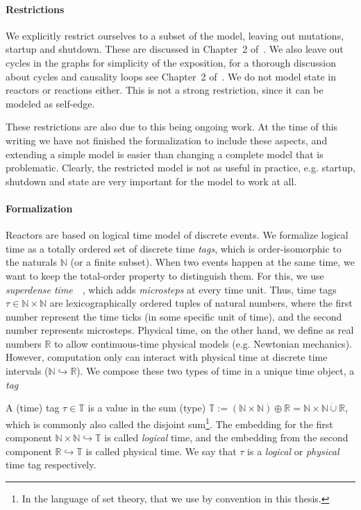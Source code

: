 \paragraph{Restrictions}
We explicitly restrict ourselves to a subset of the model, leaving out mutations, startup and shutdown.
These are discussed in Chapter~2 of~\cite{lohstroh_phdthesis}.
We also leave out cycles in the graphs for simplicity of the exposition, for a thorough discussion about cycles and causality loops see Chapter~2 of~\cite{lohstroh_phdthesis}.
We do not model state in reactors or reactions either.
This is not a strong restriction, since it can be modeled as self-edge.

These restrictions are also due to this being ongoing work.
At the time of this writing we have not finished the formalization to include these aspects, and extending a simple model is easier than changing a complete model that is problematic.
Clearly, the restricted model is not as useful in practice, e.g. startup, shutdown and state are very important for the model to work at all.

\paragraph{Formalization}
Reactors are based on logical time model of discrete events.
We formalize logical time as a totally ordered set of discrete time \emph{tags}, which is order-isomorphic to the naturals $\mathbb{N}$ (or a finite subset). 
When two events happen at the same time, we want to keep the total-order property to distinguish them.
For this, we use \emph{superdense time}~\cite{superdense,Ptolemaeus:14:SystemDesign}~, which adds \emph{microsteps} at every time unit.
Thus, time tags $\tau \in \mathbb{N} \times \mathbb{N}$ are lexicographically ordered tuples of natural numbers, where the first number represent the time ticks (in some specific unit of time), and the second number represents microsteps.
Physical time, on the other hand, we define as real numbers $\mathbb{R}$ to allow continuous-time physical models (e.g. Newtonian mechanics).
However, computation only can interact with physical time at discrete time intervals ($\mathbb{N} \hookrightarrow \mathbb{R}$).
We compose these two types of time in a unique time object, a \emph{tag}

\begin{defn}[tag]
    \label{defn:tags}
   A (time) tag $\tau \in \mathbb{T}$ is a value in the sum (type) $\mathbb{T} := (\mathbb{N} \times \mathbb{N}) \oplus \mathbb{R} = \mathbb{N} \times \mathbb{N} \dot{\cup} \mathbb{R}$, which is commonly also called the disjoint sum\footnote{In the language of set theory, that we use by convention in this thesis.}.
   The embedding for the first component $\mathbb{N} \times \mathbb{N} \hookrightarrow \mathbb{T}$ is called \emph{logical} time, and the embedding from the second component $\mathbb{R} \hookrightarrow \mathbb{T}$ is called physical time.
   We say that $\tau$ is a \emph{logical} or \emph{physical} time tag respectively.
\end{defn}

